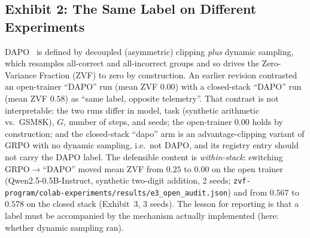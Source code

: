 \subsection{Exhibit 2: The Same Label on Different Experiments}
\label{sec:p5-exhibit-label}
DAPO~\citep{yu2025dapo} is defined by decoupled (asymmetric) clipping
\emph{plus} dynamic sampling, which resamples all-correct and all-incorrect
groups and so drives the Zero-Variance Fraction (ZVF) to zero by construction.
An earlier revision contrasted an open-trainer ``DAPO'' run (mean ZVF $0.00$)
with a closed-stack ``DAPO'' run (mean ZVF $0.58$) as ``same label, opposite
telemetry''. That contrast is not interpretable: the two runs differ in
model, task (synthetic arithmetic vs.\ GSM8K), $G$, number of steps, and
seeds; the open-trainer $0.00$ holds by construction; and the closed-stack
``dapo'' arm is an advantage-clipping variant of GRPO with no dynamic
sampling, i.e.\ not DAPO, and its registry entry should not carry the DAPO
label. The defensible content is \emph{within-stack}: switching
GRPO$\to$``DAPO'' moved mean ZVF from $0.25$ to $0.00$ on the open trainer
(Qwen2.5-0.5B-Instruct, synthetic two-digit addition, 2 seeds;
\texttt{zvf-program/colab-experiments/results/e3\_open\_audit.json}) and from
$0.567$ to $0.578$ on the closed stack (Exhibit~3, 3 seeds). The lesson for reporting is
that a label must be accompanied by the mechanism actually implemented
(here: whether dynamic sampling ran).

